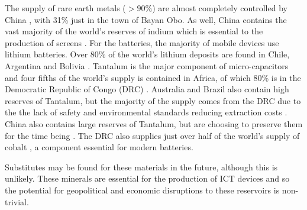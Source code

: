 \documentclass{article}
\begin{document}
The supply of rare earth metals ($>90\%$) are almost completely controlled by China \cite{schulz2018critical, physorg2012scarcemetals}, with 31\% just in the town of Bayan Obo. As well, China contains the vast majority of the world's reserves of indium which is essential to the production of screens \cite{reller2009mobile, eu2014criticalmaterials}. For the batteries, the majority of mobile devices use lithium batteries. Over 80\% of the world's lithium deposits are found in Chile, Argentina and Bolivia \cite{reller2009mobile}. Tantalum is the major component of micro-capacitors and four fifths of the world's supply is contained in Africa, of which 80\% is in the Democratic Republic of Congo (DRC) \cite{nzongola2002congo, montague2002stolen}. Australia and Brazil also contain high reserves of Tantalum, but the majority of the supply comes from the DRC due to the the lack of safety and environmental standards reducing extraction costs \cite{aspi2013tantalum}. China also contains large reserves of Tantalum, but are choosing to preserve them for the time being \cite{humanityaction2015tantalum}. The DRC also supplies just over half of the world's supply of cobalt \cite{eu2014criticalmaterials}, a component essential for modern batteries.

Substitutes may be found for these materials in the future, although this is unlikely. These minerals are essential for the production of ICT devices and so the potential for geopolitical and economic disruptions to these reservoirs is non-trivial.

\end{document}
